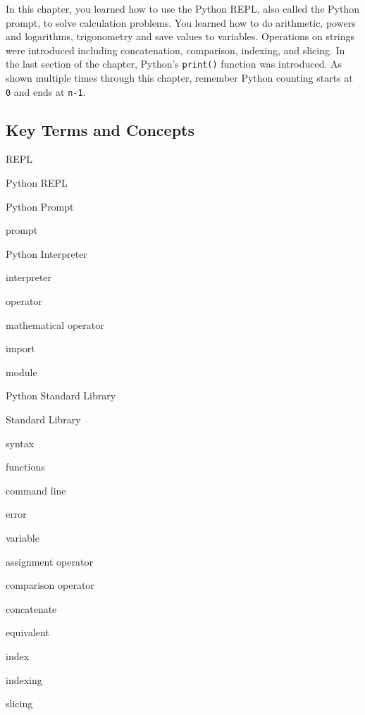 \documentclass{book}
\newenvironment{key_terms}{\begin{multicols}{3}}{\end{multicols}} %
\newcommand{\passthrough}[1]{#1}
\begin{document}
    




    
        In this chapter, you learned how to use the Python REPL, also called the
Python prompt, to solve calculation problems. You learned how to do
arithmetic, powers and logarithms, trigonometry and save values to
variables. Operations on strings were introduced including
concatenation, comparison, indexing, and slicing. In the last section of
the chapter, Python's \passthrough{\lstinline!print()!} function was
introduced. As shown multiple times through this chapter, remember
Python counting starts at \passthrough{\lstinline!0!} and ends at
\passthrough{\lstinline!n-1!}.
    




    
        \begin{key_terms}
        \hypertarget{key-terms-and-concepts}{%
\subsection{Key Terms and Concepts}\label{key-terms-and-concepts}}

REPL

Python REPL

Python Prompt

prompt

Python Interpreter

interpreter

operator

mathematical operator

import

module

Python Standard Library

Standard Library

syntax

functions

command line

error

variable

assignment operator

comparison operator

concatenate

equivalent

index

indexing

slicing
        \end{key_terms}

    
\end{document}

